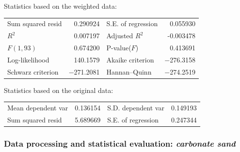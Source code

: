 \documentclass[11pt]{article}
\begin{document}
\begin{appendices}
\begin{table}[H]
\begin{center}
	\vspace{1em}Statistics based on the weighted data:

	\vspace{1ex}
	\begin{tabular}{lrlr}
		Sum squared resid &  0.290924 & S.E. of regression &  0.055930 \\
		$R^2$ &  0.007197 & Adjusted $R^2$ & -0.003478 \\
		$F(1, 93)$ &  0.674200 & P-value($F$) &  0.413691 \\
		Log-likelihood &  140.1579 & Akaike criterion & $-$276.3158 \\
		Schwarz criterion & $-$271.2081 & Hannan--Quinn & $-$274.2519 \\
	\end{tabular}

	\vspace{1em}Statistics based on the original data:

	\vspace{1ex}
	\begin{tabular}{lrlr}
		Mean dependent var &  0.136154 & S.D. dependent var &  0.149193 \\
		Sum squared resid &  5.689669 & S.E. of regression &  0.247344 \\
	\end{tabular}
	\label{tab:27}
	\end{center}
\end{table}

\subsubsection[Data processing and statistical evaluation: \textit{carbonate sand}]{Data processing and statistical evaluation: \textit{carbonate sand}}


\end{appendices}
\end{document}
